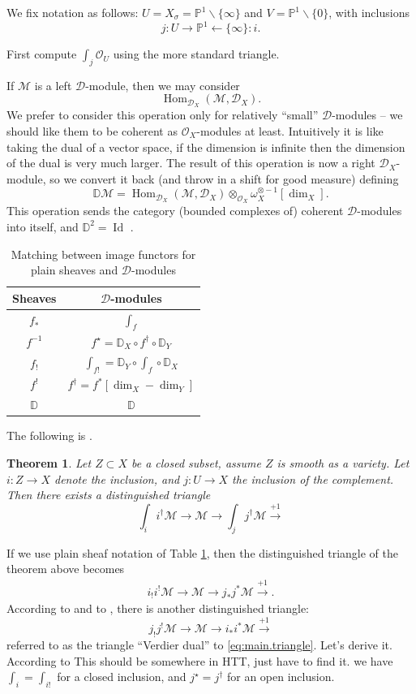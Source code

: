 \documentclass[12pt]{article}
\theoremstyle{plain}
\newtheorem{thm}{Theorem}[section]
\theoremstyle{definition}
\numberwithin{equation}{section}
\DeclareMathOperator{\Hom}{Hom}
\DeclareMathOperator{\Id}{Id}
\newcommand{\bbD}{\mathbb{D}}
\newcommand{\bbP}{\mathbb{P}}
\newcommand{\CD}{\mathcal{D}}
\newcommand{\OO}{\mathcal{O}}
\newcommand{\CM}{\mathcal{M}}
\begin{document}
We fix notation as follows: $U = X_\sigma = \bbP^1 \backslash \{\infty\}$ and $V = \bbP^1 \backslash \{0\}$, with inclusions
\[
j : U \rightarrow \bbP^1 \leftarrow \{\infty\} : i.
\]

{\color{blue}First compute $\int_j \OO_U$ using the more standard triangle.}


If $\CM$ is a left $\CD$-module, then we may consider
\[
\Hom_{\CD_X}(\CM, \CD_X).
\]
We prefer to consider this operation only for relatively ``small'' $\CD$-modules -- we should like them to be coherent as $\OO_X$-modules at least. Intuitively it is like taking the dual of a vector space, if the dimension is infinite then the dimension of the dual is very much larger. The result of this operation is now a right $\CD_X$-module, so we convert it back (and throw in a shift for good measure) defining
\[
\bbD\CM = \Hom_{\CD_X}(\CM, \CD_X) \otimes_{\OO_X} \omega_X^{\otimes -1} [\dim_X].
\]
This operation sends the category (bounded complexes of) coherent $\CD$-modules into itself, and $\bbD^2 = \Id$ {\cite[Proposition 2.6.5]{HTT}}.
\begin{table}[h!]
\centering
\begin{tabular}{ |c|c| }
\hline
Sheaves & $\CD$-modules \\
\hline
$f_*$ & $\int_f$ \\
$f^{-1}$ & $f^\star = \bbD_X \circ f^\dagger \circ \bbD_Y$ \\
$f_!$ & $\int_{f!} = \bbD_Y \circ \int_f \circ \bbD_X$ \\
$f^!$ & $f^\dagger = f^*[\dim_X-\dim_Y]$ \\
$\bbD$ & $\bbD$ \\
\hline
\end{tabular}
\caption{Matching between image functors for plain sheaves and $\CD$-modules}
\label{table:6-func}
\end{table}



The following is {\cite[Theorem 1.7.1]{HTT}}.
\begin{thm}
Let $Z \subset X$ be a closed subset, assume $Z$ is smooth as a variety. Let $i : Z \rightarrow X$ denote the inclusion, and $j : U \rightarrow X$ the inclusion of the complement. Then there exists a distinguished triangle
\[
\int_{i} i^\dagger \CM \rightarrow \CM \rightarrow \int_{j} j^\dagger \CM \xrightarrow{+1}
\]
\end{thm}
If we use plain sheaf notation of Table \ref{table:6-func}, then the distinguished triangle of the theorem above becomes
\begin{align}\label{eq:main.triangle}
i_! i^! \CM \rightarrow \CM \rightarrow j_* j^* \CM \xrightarrow{+1}.
\end{align}
According to {\cite[p. 19]{Jeffs}} and to {\cite[p. 18]{Williamson-illustrated}}, there is another distinguished triangle:
\[
j_! j^! \CM \rightarrow \CM \rightarrow i_* i^* \CM \xrightarrow{+1}
\]
referred to as the triangle ``Verdier dual'' to \eqref{eq:main.triangle}. Let's derive it. According to {\cite[p. 18]{Jeffs}} {\color{blue}This should be somewhere in HTT, just have to find it.} we have $\int_i = \int_{i!}$ for a closed inclusion, and $j^\star = j^\dagger$ for an open inclusion.
\end{document}
